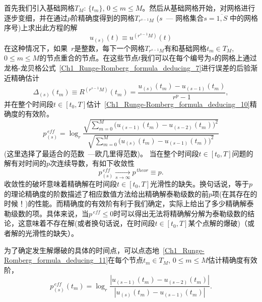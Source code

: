\documentclass[twoside]{book}
\begin{document}
\begin{CJK*}{GBK}{song}
首先我们引入基础网格$T_M$: $\{t_m\}$, $0 \leqslant m \leqslant M$。然后从基础网格开始，对网格进行逐步变细，并在通过$p$阶精确度得到的网格$T_{r^{s - 1}M}$ ($s$~--- 网格集合$s = \overline{1,S}$ 中的网格序号)上求出此方程的解
\begin{equation*}
    u_{(s)}(t) \equiv u^{(r^{s - 1}M)}(t)
\end{equation*}
在这种情况下，如果~$r$是整数，每下一个网格$T_{r^{s - 1}M}$有和基础网格$t_m \in T_M$, $0 \leqslant m \leqslant M$的节点重合的节点。在这些节点$t$我们可以在每个编号为$s$的网格上通过龙格-龙贝格公式~\eqref{Ch1_Runge-Romberg_formula_deducing_7}进行误差的后验渐近精确估计
\begin{equation*}
	\Delta_{(s)}(t_m) \equiv R^{(r^{s - 1}M)}(t_m) =  \frac{u_{(s)}(t_m) - u_{(s - 1)}(t_m)}{r^p - 1},
\end{equation*}
并在整个时间段$t \in [t_0,T]$估计~\eqref{Ch1_Runge-Romberg_formula_deducing_10}精确度的有效阶。
\begin{equation}
    \label{p_eff_total}
	p^{\, eff}_{(s)} = \log_{r}{\dfrac{\sqrt{\sum\limits_{m = 0}^M \big(u_{(s - 1)}(t_m) - u_{(s - 2)}(t_m)\big)^2}}{\sqrt{\sum\limits_{m = 0}^M  \big(u_{(s)}(t_m) - u_{(s - 1)}(t_m)\big)^2}}}
\end{equation}
(这里选择了最适合的范数~---欧几里得范数)。
当在整个时间段$t \in [t_0,T]$问题的解有对时间的$p$次连续导数，有如下收敛性
\begin{equation*}
    \label{convergence_1}
    p^{\, eff}_{(s)} \xrightarrow[s \to \infty]{} p^{\, theor} \equiv p.
\end{equation*}
收敛性的破坏意味着精确解在时间段$t \in [t_0,T]$光滑性的缺失。换句话说，等于$p$的理论精确度的阶数描述了相应数值方法给出精确解泰勒级数的前$p$项(在其存在的时候！)的性能。而精确度的有效阶有利于我们确定，实际上给出了多少精确解泰勒级数的项。具体来说，当$p^{\, eff} \leqslant 0 $时可以得出无法将精确解分解为泰勒级数的结论，这意味着不存在解(或者换句话说，在时间段$t \in [t_0,T]$某个点解的爆破)（或者解的光滑性的缺失）。

为了确定发生解爆破的具体的时间点，可以点态地~\eqref{Ch1_Runge-Romberg_formula_deducing_11}在每个节点$t_m \in T_M$, $0 \leqslant m \leqslant M$估计精确度有效阶，
\begin{equation}
    \label{p_eff_for_every_time}
	p^{\, eff}_{(s)}(t_m) = \log_{r}{\dfrac{|u_{(s - 1)}(t_m) - u_{(s - 2)}(t_m)|}{|u_{(s)}(t_m) - u_{(s - 1)}(t_m)|}}.
\end{equation}


\end{CJK*}
\end{document}
